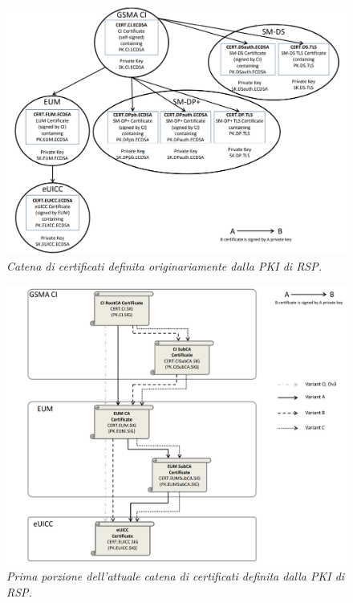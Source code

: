 \documentclass[10pt, oneside]{book}
\begin{document}
\begin{figure}
\includegraphics[width=\linewidth]{cert-chain.png}
\caption{\textit{Catena di certificati definita originariamente dalla PKI di RSP.}}
\label{fig:cert-chain}
\end{figure}
\begin{figure}
\includegraphics[width=\linewidth]{cert-chain-new1.png}
\caption{\textit{Prima porzione dell'attuale catena di certificati definita dalla PKI di RSP.}}
\label{fig:cert-chain-new1}
\end{figure}
\end{document}
